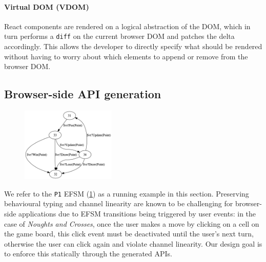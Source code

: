 
\paragraph{Virtual DOM (VDOM)}
React components are rendered on a logical
abstraction of the DOM, which in turn performs a \texttt{diff} on the current
browser DOM and patches the delta accordingly.
This allows the developer to
directly specify what should be rendered without having to worry about which
elements to append or remove from the browser DOM.

\subsection{Browser-side API generation}

\label{section:browser}

\begin{figure}
  \begin{center}
    \includegraphics[width=0.4\textwidth]{figures/efsm_p1.png}
  \end{center}

  \label{fig:efsmp1}
\end{figure}

We refer to the \texttt{P1} EFSM (\cref{fig:efsmp1}) as a running example in
this section.
Preserving behavioural typing and channel linearity are known to be challenging
for browser-side applications due to EFSM transitions being triggered by user
events:
in the case of \textit{Noughts and Crosses}, once the user makes a move by
clicking on a cell on the game board, this click event must be deactivated
until the user's next turn, otherwise the user can click again and violate
channel linearity.
Our design goal is to enforce this statically through the generated APIs.


